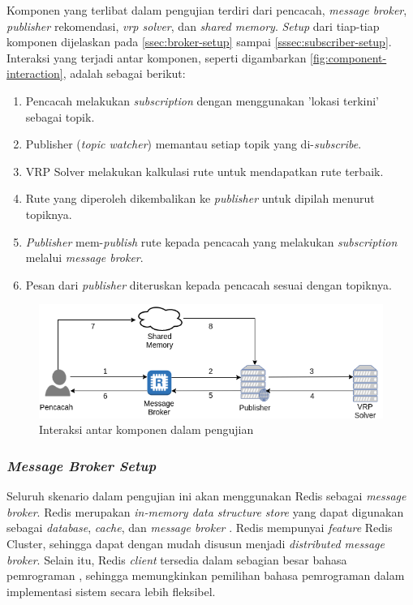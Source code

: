 Komponen yang terlibat dalam pengujian terdiri dari pencacah, \textit{message broker}, \textit{publisher} rekomendasi, \textit{vrp solver}, dan \textit{shared memory}. \textit{Setup} dari tiap-tiap komponen dijelaskan pada \autoref{ssec:broker-setup} sampai \autoref{sssec:subscriber-setup}. Interaksi yang terjadi antar komponen, seperti digambarkan \autoref{fig:component-interaction}, adalah sebagai berikut:


\begin{enumerate}
	\item Pencacah melakukan \textit{subscription} dengan menggunakan 'lokasi terkini' sebagai topik.
	\item Publisher (\textit{topic watcher}) memantau setiap topik yang di-\textit{subscribe}.
	\item VRP Solver melakukan kalkulasi rute untuk mendapatkan rute terbaik.
	\item Rute yang diperoleh dikembalikan ke \textit{publisher} untuk dipilah menurut topiknya.
	\item \textit{Publisher} mem-\textit{publish} rute kepada pencacah yang melakukan \textit{subscription} melalui \textit{message broker}.
	\item Pesan dari \textit{publisher} diteruskan kepada pencacah sesuai dengan topiknya.
\end{enumerate}


\begin{figure}[!]
	\centering
	\includegraphics[width=\textwidth]{Resources/Images/component-interaction}
	\caption{Interaksi antar komponen dalam pengujian}
	\label{fig:component-interaction}
\end{figure}


\subsubsection{\textit{Message Broker Setup}}
\label{ssec:broker-setup}
Seluruh skenario dalam pengujian ini akan menggunakan Redis sebagai \textit{message broker}. Redis merupakan \textit{in-memory data structure store} yang dapat digunakan sebagai \textit{database}, \textit{cache}, dan \textit{message broker} \citep{redis_introduction_2017}. Redis mempunyai \textit{feature} Redis Cluster, sehingga dapat dengan mudah disusun menjadi \textit{distributed message broker}. Selain itu, Redis \textit{client} tersedia dalam sebagian besar bahasa pemrograman \citep{redis_clients_2017}, sehingga memungkinkan pemilihan bahasa pemrograman dalam implementasi sistem secara lebih fleksibel.


